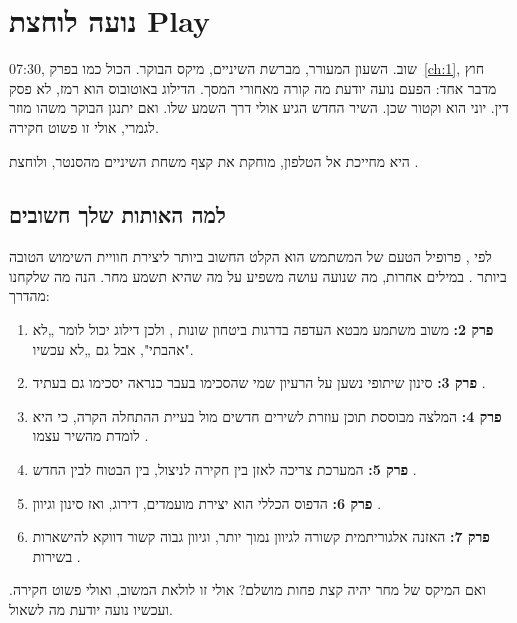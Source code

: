 
\chapter{נועה לוחצת Play}\label{ch:8}

\begin{scene}
07:30, שוב. השעון המעורר, מברשת השיניים, מיקס הבוקר. הכול כמו בפרק~\ref{ch:1}, חוץ מדבר אחד: הפעם נועה יודעת מה קורה מאחורי המסך. הדילוג באוטובוס הוא רמז, לא פסק דין. יוני הוא וקטור שכן. השיר החדש הגיע אולי דרך השמע שלו. ואם יתנגן הבוקר משהו מוזר לגמרי, אולי זו פשוט חקירה.

היא מחייכת אל הטלפון, מוחקת את קצף משחת השיניים מהסנטר, ולוחצת .
\end{scene}

\section{למה האותות שלך חשובים}

לפי , פרופיל הטעם של המשתמש הוא הקלט החשוב ביותר ליצירת חוויית השימוש הטובה ביותר \cite{spotify2026understanding}. במילים אחרות, מה שנועה עושה משפיע על מה שהיא תשמע מחר. הנה מה שלקחנו מהדרך:

\begin{inshort}
\begin{enumerate}
  \item \textbf{פרק 2:} משוב משתמע מבטא העדפה בדרגות ביטחון שונות \cite{hu2008collaborative}, ולכן דילוג יכול לומר „לא אהבתי", אבל גם „לא עכשיו".
  \item \textbf{פרק 3:} סינון שיתופי נשען על הרעיון שמי שהסכימו בעבר כנראה יסכימו גם בעתיד \cite{resnick1994grouplens}.
  \item \textbf{פרק 4:} המלצה מבוססת תוכן עוזרת לשירים חדשים מול בעיית ההתחלה הקרה, כי היא לומדת מהשיר עצמו \cite{vandenoord2013deep}.
  \item \textbf{פרק 5:} המערכת צריכה לאזן בין חקירה לניצול, בין הבטוח לבין החדש \cite{mcinerney2018explore}.
  \item \textbf{פרק 6:} הדפוס הכללי הוא יצירת מועמדים, דירוג, ואז סינון וגיוון \cite{google2026overview,covington2016deep}.
  \item \textbf{פרק 7:} האזנה אלגוריתמית קשורה לגיוון נמוך יותר, וגיוון גבוה קשור דווקא להישארות בשירות \cite{anderson2020algorithmic}.
\end{enumerate}
\end{inshort}

ואם המיקס של מחר יהיה קצת פחות מושלם? אולי זו לולאת המשוב, ואולי פשוט חקירה. ועכשיו נועה יודעת מה לשאול.
